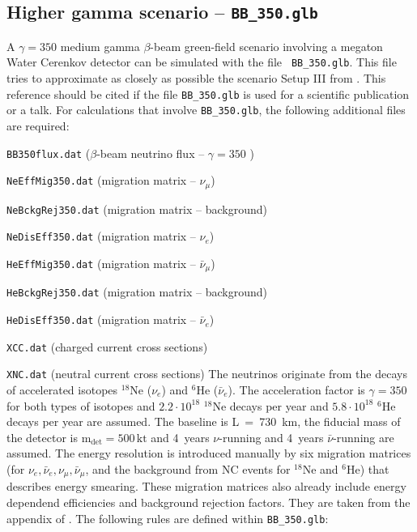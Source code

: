 \begin{appendix}
\subsection*{Higher gamma scenario -- {\tt BB\_350.glb}}

A $\gamma=350$ medium gamma $\beta$-beam green-field scenario involving a megaton Water Cerenkov detector can be simulated with the file {\tt
BB\_350.glb}. This file tries to approximate as closely as possible the scenario {\sf Setup III} from
\cite{Burguet-Castell:2005pa}. This reference
should be cited if the file {\tt BB\_350.glb} is used for a scientific publication or a talk. For calculations that
involve {\tt BB\_350.glb}, the following additional files are required: 
\bi
\item {\tt BB350flux.dat} ($\beta$-beam neutrino flux -- $\gamma=350$ )
\item {\tt NeEffMig350.dat} (migration matrix -- $\nu_\mu$)
\item {\tt NeBckgRej350.dat} (migration matrix -- background)
\item {\tt NeDisEff350.dat} (migration matrix -- $\nu_e$)
\item {\tt HeEffMig350.dat} (migration matrix -- $\bar{\nu}_\mu$)
\item {\tt HeBckgRej350.dat} (migration matrix -- background)
\item {\tt HeDisEff350.dat} (migration matrix -- $\bar{\nu}_e$)
\item {\tt XCC.dat} (charged current cross sections)
\item {\tt XNC.dat} (neutral current cross sections)
\ei
The neutrinos originate from the decays of accelerated isotopes $^{18}$Ne ($\nu_e$) and $^6$He ($\bar{\nu}_e$).
The acceleration factor is $\gamma=350$ for both types of isotopes and $2.2\cdot10^{18}$ $^{18}$Ne decays per
year and $5.8\cdot10^{18}$ $^{6}$He decays per year are assumed. The baseline is L~=~730~km, the
fiducial mass of the detector is $\mathrm{m_{det} = 500 \,kt}$ and 4~years $\nu$-running and 4~years
$\bar{\nu}$-running are assumed. The energy resolution is introduced manually by
six migration matrices (for $\nu_e , \bar{\nu}_e ,\nu_{\mu} ,\bar{\nu}_\mu$, and the background from NC events
for $^{18}$Ne and $^6$He) that describes energy smearing. These migration matrices also already include energy
dependend efficiencies and background rejection factors. They are taken from the appendix of
\cite{Burguet-Castell:2005pa}. The following rules are defined within {\tt BB\_350.glb}:
\begin{center}

\end{center}
\end{appendix}
